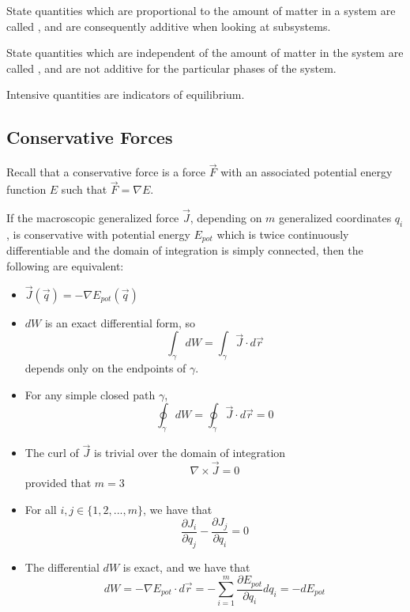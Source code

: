 \documentclass[12pt, a4paper, oneside, openright, titlepage]{book}
\begin{document}
\begin{defn}
    State quantities which are proportional to the amount of matter in a system are called , and are consequently additive when looking at subsystems.
\end{defn}

\begin{defn}
    State quantities which are independent of the amount of matter in the system are called , and are not additive for the particular phases of the system.
\end{defn}

Intensive quantities are indicators of equilibrium. 


\subsection{Conservative Forces}

\begin{rec}
    Recall that a conservative force is a force $\vec{F}$ with an associated potential energy function $E$ such that $\vec{F} = \nabla E$.
\end{rec}

\begin{prop}
    If the macroscopic generalized force $\vec{J}$, depending on $m$ generalized coordinates $q_i$, is conservative with potential energy $E_{pot}$ which is twice continuously differentiable and the domain of integration is simply connected, then the following are equivalent:
    \begin{itemize}
        \item $\vec{J}(\vec{q}) = -\nabla E_{pot}(\vec{q})$
        \item $dW$ is an exact differential form, so $$\int_{\gamma}dW = \int_{\gamma}\vec{J}\cdot d\vec{r}$$ depends only on the endpoints of $\gamma$.
        \item For any simple closed path $\gamma$, $$\oint_{\gamma}dW = \oint_{\gamma}\vec{J}\cdot d\vec{r} = 0$$
        \item The curl of $\vec{J}$ is trivial over the domain of integration $$\nabla \times \vec{J} = 0$$ provided that $m = 3$
        \item For all $i,j \in \{1,2,...,m\}$, we have that \begin{equation*}
                \frac{\partial J_i}{\partial q_j} - \frac{\partial J_j}{\partial q_i} = 0
        \end{equation*}
        \item The differential $dW$ is exact, and we have that \begin{equation*}
                dW = -\nabla E_{pot}\cdot d\vec{r} = -\sum_{i=1}^m\frac{\partial E_{pot}}{\partial q_i}dq_i = -dE_{pot}
        \end{equation*}
    \end{itemize}
\end{prop}
\end{document}
